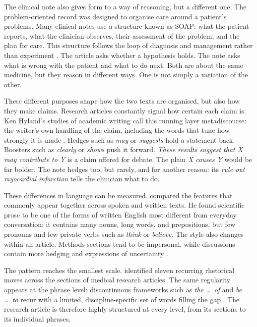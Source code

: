 \begin{reviewread}
The clinical note also gives form to a way of reasoning, but a different one.
The problem-oriented record was designed to organise care around a patient's problems.
Many clinical notes use a structure known as SOAP: what the patient reports, what the clinician observes, their assessment of the problem, and the plan for care.
This structure follows the loop of diagnosis and management rather than experiment \citep{weed_records_1968}.
The article asks whether a hypothesis holds.
The note asks what is wrong with the patient and what to do next.
Both are about the same medicine, but they reason in different ways.
One is not simply a variation of the other.
\end{reviewread}

\begin{reviewread}
These different purposes shape how the two texts are organised, but also how they make claims.
Research articles constantly signal how certain each claim is.
Ken Hyland's studies of academic writing call this running layer metadiscourse: the writer's own handling of the claim, including the words that tune how strongly it is made \citep{hyland_metadiscourse_2005,hyland_tse_2004}.
Hedges such as \emph{may} or \emph{suggests} hold a statement back.
Boosters such as \emph{clearly} or \emph{shows} push it forward.
\emph{These results suggest that X may contribute to Y} is a claim offered for debate.
The plain \emph{X causes Y} would be far bolder.
The note hedges too, but rarely, and for another reason: its \emph{rule out myocardial infarction} tells the clinician what to do.
\end{reviewread}

\begin{reviewread}
These differences in language can be measured.
\citet{biber_variation_1988} compared the features that commonly appear together across spoken and written texts.
He found scientific prose to be one of the forms of written English most different from everyday conversation: it contains many nouns, long words, and prepositions, but few pronouns and few private verbs such as \emph{think} or \emph{believe}.
The style also changes within an article.
Methods sections tend to be impersonal, while discussions contain more hedging and expressions of uncertainty \citep{biber_finegan_1994}.
\end{reviewread}

\begin{reviewread}
The pattern reaches the smallest scale.
\citet{nwogu_medical_1997} identified eleven recurring rhetorical moves across the sections of medical research articles.
The same regularity appears at the phrase level: discontinuous frameworks such as \emph{the \ldots\ of} and \emph{be \ldots\ to} recur with a limited, discipline-specific set of words filling the gap \citep{luzon_collocational_2000}.
The research article is therefore highly structured at every level, from its sections to its individual phrases.
\end{reviewread}

